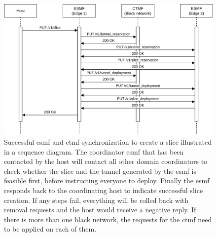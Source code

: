 \begin{figure}[H]
  \centering
  \includegraphics[width=\linewidth]{images/chapter_6/slice_creation_coordination.png}
  \caption[Slice creation on the coordinators]{Successful \acrshort{esmf} and \acrshort{ctmf} synchronization to create a slice illustrated in a sequence diagram. The coordinator \acrshort{esmf} that has been contacted by the host will contact all other domain coordinators to check whether the slice and the tunnel generated by the \acrshort{esmf} is feasible first, before instructing everyone to deploy. Finally the \acrshort{esmf} responds back to the coordinating host to indicate successful slice creation. If any steps fail, everything will be rolled back with removal requests and the host would receive a negative reply. If there is more than one black network, the requests for the \acrshort{ctmf} need to be applied on each of them.}
  \label{fig:slice_creation_synchronization}
\end{figure}
